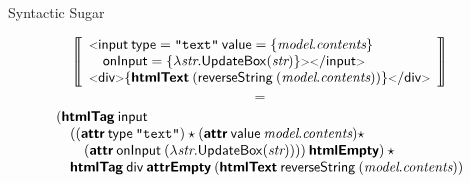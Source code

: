 \documentclass[11.5pt, aspectratio=169]{beamer}
\begin{document}
\begin{frame}{Syntactic Sugar}

    \[
      \left\llbracket
    \begin{array}{l}
      \opentag{input} \: \attribute{type}=\textnode{"text"} \:
      \attribute{value} = \{ \var{model}.\var{contents} \} \\
      \quad
        \attribute{onInput} = \{ \lambda \textit{str}.
          \mkwd{UpdateBox}(\textit{str})\} \closetag \tagzeroend{input}  \\
        \htmltagzero{div}{\antiquote{\htmltext{(\metadef{reverseString} \:
        (\textit{model}. \textit{contents}))}}}
    \end{array}
    \right\rrbracket
  \]%
  \vspace{0.25em}
  {\Huge
  \[
    =
  \]%
}
  \[
    \begin{array}{l}
        (\textbf{\textsf{htmlTag}} \: \textsf{input} \\
        \quad ((\textbf{\textsf{attr}} \: \mathsf{type} \: \texttt{"text"}) \star
        (\textbf{\textsf{attr}} \: \mathsf{value} \: \textit{model}.\textit{contents}) \star \\
         \qquad
         (\textbf{\textsf{attr}} \: \mathsf{onInput} \: (\lambda \textit{str}.
         \mathsf{UpdateBox}(\textit{str})))) \: \textbf{\textsf{htmlEmpty}}) \: \star \\
         \quad
         \textbf{\textsf{htmlTag}} \: \textsf{div} \: \textbf{\textsf{attrEmpty}} \: (\textbf{\textsf{htmlText}} \: \mathsf{reverseString} \:
         (\textit{model}.\textit{contents}))
    \end{array}
  \]
\end{frame}
\end{document}
